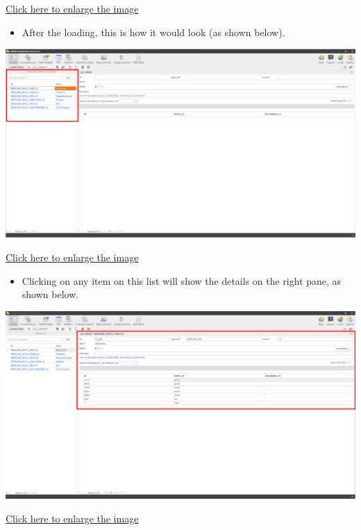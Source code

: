 \documentclass[
]{book}
\providecommand{\tightlist}{%
  \setlength{\itemsep}{0pt}\setlength{\parskip}{0pt}}
\begin{document}
\href{images/image094.png}{Click here to enlarge the image}

\begin{itemize}
\tightlist
\item
  After the loading, this is how it would look (as shown below).
\end{itemize}

\begin{center}\includegraphics[width=1\linewidth]{./images/image096} \end{center}

\href{images/image096.png}{Click here to enlarge the image}

\begin{itemize}
\tightlist
\item
  Clicking on any item on this list will show the details on the right pane, as shown below.
\end{itemize}

\begin{center}\includegraphics[width=1\linewidth]{./images/image098} \end{center}

\href{images/image098.png}{Click here to enlarge the image}
\end{document}
